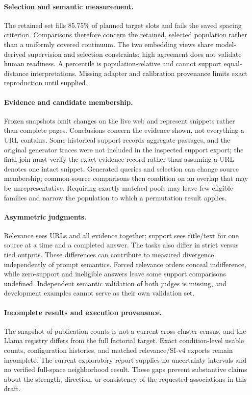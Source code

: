 \paragraph{Selection and semantic measurement.}
The retained set fills 85.75\% of planned target slots and fails the saved spacing criterion. Comparisons therefore concern the retained, selected population rather than a uniformly covered continuum. The two embedding views share model-derived supervision and selection constraints; high agreement does not validate human readiness. A percentile is population-relative and cannot support equal-distance interpretations. Missing adapter and calibration provenance limits exact reproduction until supplied.

\paragraph{Evidence and candidate membership.}
Frozen snapshots omit changes on the live web and represent snippets rather than complete pages. Conclusions concern the evidence shown, not everything a URL contains. Some historical support records aggregate passages, and the original generator traces were not included in the inspected support export; the final join must verify the exact evidence record rather than assuming a URL denotes one intact snippet. Generated queries and selection can change source membership; common-source comparisons then condition on an overlap that may be unrepresentative. Requiring exactly matched pools may leave few eligible families and narrow the population to which a permutation result applies.

\paragraph{Asymmetric judgments.}
Relevance sees URLs and all evidence together; support sees title/text for one source at a time and a completed answer. The tasks also differ in strict versus tied outputs. These differences can contribute to measured divergence independently of prompt semantics. Forced relevance orders conceal indifference, while zero-support and ineligible answers leave some support comparisons undefined. Independent semantic validation of both judges is missing, and development examples cannot serve as their own validation set.

\paragraph{Incomplete results and execution provenance.}
The snapshot of publication counts is not a current cross-cluster census, and the Llama registry differs from the full factorial target. Exact condition-level usable counts, configuration histories, and matched relevance/SI-v4 exports remain incomplete. The current exploratory report supplies no uncertainty intervals and no verified full-space neighborhood result. These gaps prevent substantive claims about the strength, direction, or consistency of the requested associations in this draft.

